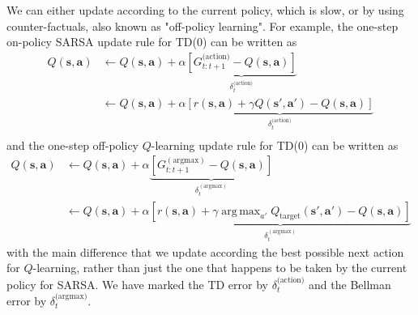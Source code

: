 \documentclass{article}
\DeclareMathOperator*{\argmax}{arg\,max}
\begin{document}
We can either update according to the current policy, which is slow, or by using counter-factuals, also known as "off-policy learning". For example, the one-step on-policy SARSA update rule for TD(0) can be written as
\begin{equation}
\label{eq:SARSA_update}
\begin{split}
Q(\mathbf{s},\mathbf{a})&\leftarrow Q(\mathbf{s},\mathbf{a})+\alpha\underbrace{\left[G_{t:t+1}^\text{(action)}-Q(\mathbf{s},\mathbf{a})\right]}_\text{$\delta_t^\text{(action)}$}\\
&\leftarrow Q(\mathbf{s},\mathbf{a})+\alpha\underbrace{\left[r(\mathbf{s},\mathbf{a})+\gamma Q(\mathbf{s}',\mathbf{a}')-Q(\mathbf{s},\mathbf{a})\right]}_\text{$\delta_t^\text{(action)}$}\\
\end{split}
\end{equation}and the one-step off-policy $Q$-learning update rule for TD(0) can be written as
\begin{equation}\begin{split}\label{eq:q_learning_update}
Q(\mathbf{s},\mathbf{a})&\leftarrow Q(\mathbf{s},\mathbf{a})+\alpha\underbrace{\left[G_{t:t+1}^{(\text{argmax})}-Q(\mathbf{s},\mathbf{a})\right]}_{\delta_t^{(\text{argmax})}}\\&\leftarrow Q(\mathbf{s},\mathbf{a})+\alpha\underbrace{\left[r(\mathbf{s},\mathbf{a})+\gamma \argmax_{a'}Q_\text{target}(\mathbf{s}',\mathbf{a}')-Q(\mathbf{s},\mathbf{a})\right]}_{\delta_t^{(\text{argmax})}}
\end{split}\end{equation}with the main difference that we update according the best possible next action for $Q$-learning, rather than just the one that happens to be taken by the current policy for SARSA. We have marked the TD error by $\delta_t^\text{(action)}$ and the Bellman error by $\delta_t^\text{(argmax)}$. 
\end{document}
